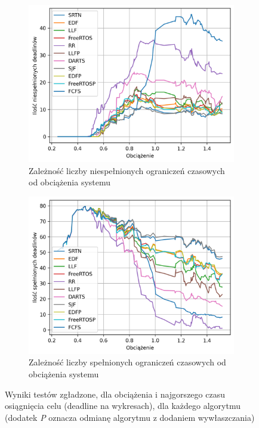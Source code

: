 \documentclass[../../main]{subfiles}
\begin{document}
\begin{figure}[h]
    \centering
    \begin{subfigure}{0.85\textwidth}
        \includegraphics[width=1\textwidth]{Images/diagrams/loadfactor-misses.png}
        \caption{Zależność liczby niespełnionych ograniczeń czasowych od obciążenia systemu}
        \label{fig:loadfactor-misses}
    \end{subfigure}
    \hfill
    \begin{subfigure}{0.85\textwidth}
        \includegraphics[width=1\textwidth]{Images/diagrams/loadfactor-catches.png}
        \caption{Zależność liczby spełnionych ograniczeń czasowych od obciążenia systemu}
        \label{fig:loadfactor-catches}
    \end{subfigure}
    \caption{Wyniki testów zgładzone, dla obciążenia i najgorszego czasu osiągnięcia celu (deadline na wykresach), dla każdego algorytmu (dodatek \textit{P} oznacza odmianę algorytmu z dodaniem wywłaszczania)}
    \label{fig:results-loadfactor}
\end{figure}
\end{document}
